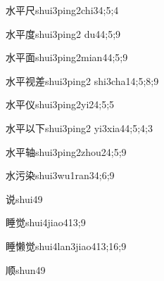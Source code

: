 \begin{verbete}{水平尺}{shui3ping2chi3}{4;5;4}
\end{verbete}

\begin{verbete}{水平度}{shui3ping2 du4}{4;5;9}
\end{verbete}

\begin{verbete}{水平面}{shui3ping2mian4}{4;5;9}
\end{verbete}

\begin{verbete}{水平视差}{shui3ping2 shi3cha1}{4;5;8;9}
\end{verbete}

\begin{verbete}{水平仪}{shui3ping2yi2}{4;5;5}
\end{verbete}

\begin{verbete}{水平以下}{shui3ping2 yi3xia4}{4;5;4;3}
\end{verbete}

\begin{verbete}{水平轴}{shui3ping2zhou2}{4;5;9}
\end{verbete}

\begin{verbete}{水污染}{shui3wu1ran3}{4;6;9}
\end{verbete}

\begin{verbete}{说}{shui4}{9}
\end{verbete}

\begin{verbete}{睡觉}{shui4jiao4}{13;9}
\end{verbete}

\begin{verbete}{睡懒觉}{shui4lan3jiao4}{13;16;9}
\end{verbete}

\begin{verbete}{顺}{shun4}{9}
\end{verbete}

